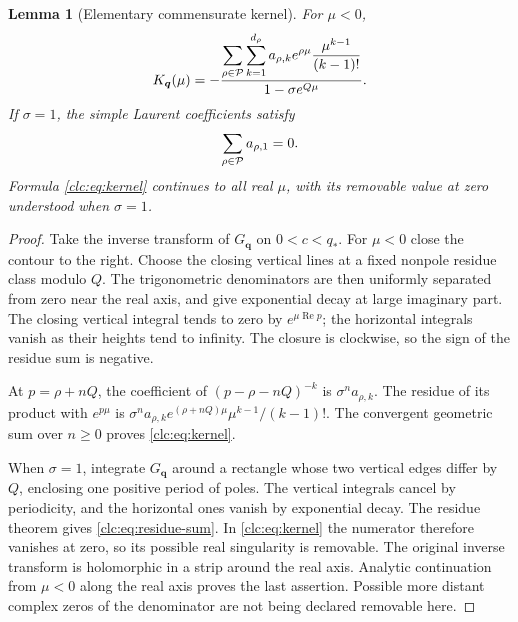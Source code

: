 \documentclass[11pt,a4paper]{article}
\numberwithin{equation}{section}
\newtheorem{lemma}[theorem]{Lemma}
\theoremstyle{definition}\newtheorem{definition}[theorem]{Definition}
\theoremstyle{remark}\newtheorem{remark}[theorem]{Remark}
\DeclareMathOperator{\Rea}{Re}
\newcommand{\bq}{\boldsymbol q}\newcommand{\bs}{\boldsymbol s}
\begin{document}
\begin{lemma}[Elementary commensurate kernel]\label{clc:lem:kernel}
For $\mu<0$,
\begin{equation}\label{clc:eq:kernel}
 K_{\bq}(\mu)=
 -\frac{\displaystyle\sum_{\rho\in\PP}\sum_{k=1}^{d_\rho}
 a_{\rho,k}e^{\rho\mu}\frac{\mu^{k-1}}{(k-1)!}}
 {1-\sigma e^{Q\mu}}.
\end{equation}
If $\sigma=1$, the simple Laurent coefficients satisfy
\begin{equation}\label{clc:eq:residue-sum}
 \sum_{\rho\in\mathcal P}a_{\rho,1}=0.
\end{equation}
Formula \eqref{clc:eq:kernel} continues to all real $\mu$, with its
removable value at zero understood when $\sigma=1$.
\end{lemma}
\begin{proof}
Take the inverse transform of $G_{\bq}$ on $0<c<q_*$. For $\mu<0$ close
the contour to the right. Choose the closing vertical lines at a fixed
nonpole residue class modulo $Q$. The trigonometric denominators are
then uniformly separated from zero near the real axis, and give
exponential decay at large imaginary part. The closing vertical
integral tends to zero by $e^{\mu\Rea p}$; the horizontal integrals
vanish as their heights tend to infinity. The closure is clockwise,
so the sign of the residue sum is negative.

At $p=\rho+nQ$, the coefficient of $(p-\rho-nQ)^{-k}$ is
$\sigma^n a_{\rho,k}$. The residue of its product with $e^{p\mu}$ is
$\sigma^na_{\rho,k}e^{(\rho+nQ)\mu}\mu^{k-1}/(k-1)!$.
The convergent geometric sum over $n\ge0$ proves
\eqref{clc:eq:kernel}.

When $\sigma=1$, integrate $G_{\bq}$ around a rectangle whose two
vertical edges differ by $Q$, enclosing one positive period of poles.
The vertical integrals cancel by periodicity, and the horizontal ones
vanish by exponential decay. The residue theorem gives
\eqref{clc:eq:residue-sum}. In \eqref{clc:eq:kernel} the numerator
therefore vanishes at zero, so its possible real singularity is
removable. The original inverse transform is holomorphic in a strip
around the real axis. Analytic continuation from $\mu<0$ along the
real axis proves the last assertion. Possible more distant complex
zeros of the denominator are not being declared removable here.
\end{proof}
\end{document}

